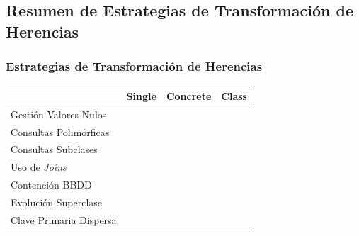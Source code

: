 \documentclass[a4paper,slidestop,xcolor=pst,blue]{beamer}
\newcommand{\cmark}{\ding{51}}
\newcommand{\xmark}{\ding{55}}
\begin{document}
\subsection{Resumen de Estrategias de Transformación de Herencias}

\begin{frame}[c]
    \frametitle{Estrategias de Transformación de Herencias}
    \begin{center}
        \begin{tabular}{||l|c|c|c||}
        \hline \hline
                                & Single         & Concrete        & Class   \\ \hline
        Gestión Valores Nulos   & \xmark         & \cmark          & \cmark  \\ \hline
        Consultas Polimórficas  & \cmark         & \xmark          & \xmark  \\ \hline
        Consultas Subclases     & \xmark         & \cmark          & \cmark  \\ \hline
        Uso de \emph{Joins}     & \cmark         & \cmark          & \xmark  \\ \hline
        Contención BBDD         & \xmark         & \cmark          & \cmark  \\ \hline
        Evolución Superclase    & \cmark         & \xmark          & \cmark  \\ \hline
        Clave Primaria Dispersa & \xmark         & \cmark          & \xmark  \\ \hline
        \hline
        \end{tabular}
    \end{center}
\end{frame}
\end{document}
